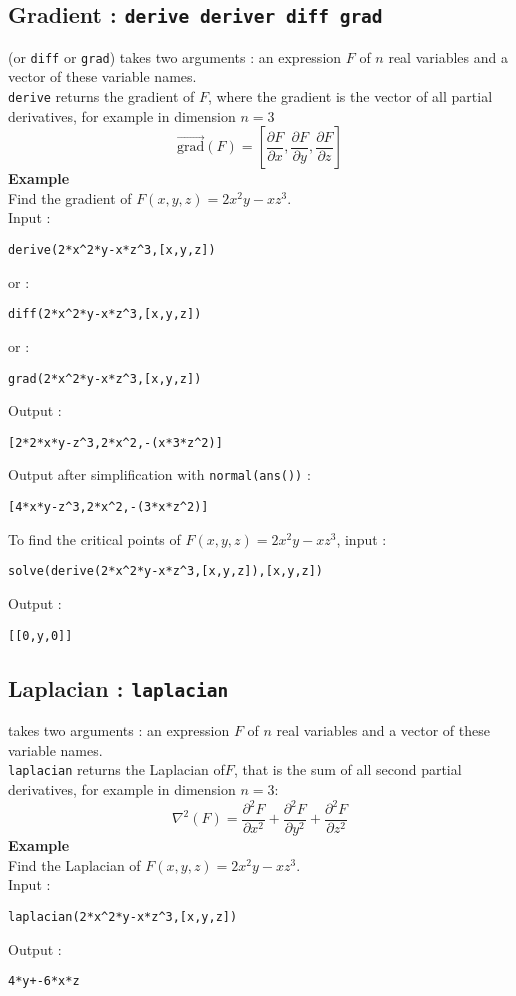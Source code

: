\documentclass[a4paper,11pt]{book}
\begin{document}
\subsection{Gradient : {\tt derive deriver diff grad}}\label{sec:derive}
 (or {\tt diff} or {\tt grad}) takes two arguments : an 
expression $F$ of $n$ real variables and a vector of these variable names.\\
{\tt derive} returns the gradient of $F$,
where the gradient is the vector of all partial derivatives,
for example in dimension $n=3$
\[ \overrightarrow{\mbox{grad}}(F)= [\frac{\partial F}{\partial x},\frac{\partial F}{\partial y},\frac{\partial F}{\partial z}] \]
{\bf Example} \\
Find the gradient of $F(x,y,z)=2x^2y-xz^3$.\\
Input :
\begin{center}{\tt derive(2*x\verb|^|2*y-x*z\verb|^|3,[x,y,z])}\end{center}
or :
\begin{center}{\tt diff(2*x\verb|^|2*y-x*z\verb|^|3,[x,y,z])}\end{center}
or :
\begin{center}{\tt grad(2*x\verb|^|2*y-x*z\verb|^|3,[x,y,z])}\end{center}
Output :
\begin{center}{\tt [2*2*x*y-z\verb|^|3,2*x\verb|^|2,-(x*3*z\verb|^|2)]}\end{center}
Output after simplification with {\tt normal(ans())} :
\begin{center}{\tt [4*x*y-z\verb|^|3,2*x\verb|^|2,-(3*x*z\verb|^|2)]}\end{center}
To find the critical points of 
$F(x,y,z)=2x^2y-xz^3$, input :
\begin{center}{\tt solve(derive(2*x\verb|^|2*y-x*z\verb|^|3,[x,y,z]),[x,y,z])}\end{center} 
Output :
\begin{center}{\tt [[0,y,0]]}\end{center} 

\subsection{Laplacian : {\tt laplacian}}
 takes two arguments : an 
expression $F$ of $n$ real variables and a vector of these variable names.\\
{\tt laplacian} returns the Laplacian of$F$, that is the sum of all second
partial derivatives, for example in dimension $n=3$:
\[ \nabla^2(F)=\frac{\partial^2 F}{\partial x^2}+\frac{\partial^2 F}{\partial y^2}+\frac{\partial^2 F}{\partial z^2} \]
{\bf Example}\\
Find the Laplacian of $F(x,y,z)=2x^2y-xz^3$.\\
Input :
\begin{center}{\tt laplacian(2*x\verb|^|2*y-x*z\verb|^|3,[x,y,z])}\end{center}
Output :
\begin{center}{\tt 4*y+-6*x*z}\end{center}
\end{document}
